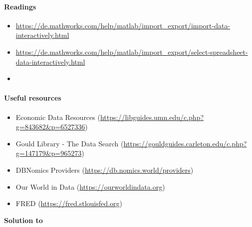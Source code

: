 \paragraph{Readings}
\begin{itemize}
\item {\footnotesize\url{https://de.mathworks.com/help/matlab/import_export/import-data-interactively.html}}
\item {\footnotesize\url{https://de.mathworks.com/help/matlab/import_export/select-spreadsheet-data-interactively.html}}
\item \textcite[Ch.2]{Bjornland.Thorsrud_2015_AppliedTimeSeries}
\end{itemize}

\paragraph{Useful resources}
\begin{itemize}	
\item Economic Data Resources (\url{https://libguides.umn.edu/c.php?g=843682&p=6527336})
\item Gould Library {-} The Data Search (\url{https://gouldguides.carleton.edu/c.php?g=147179&p=965273})
\item DBNomics Providers (\url{https://db.nomics.world/providers})
\item Our World in Data (\url{https://ourworldindata.org})
\item FRED (\url{https://fred.stlouisfed.org})
\end{itemize}

\begin{solution}\textbf{Solution to }
\ifDisplaySolutions%

\fi
\newpage
\end{solution}